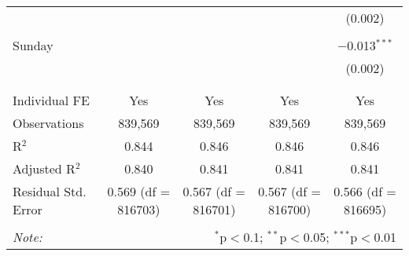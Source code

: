\documentclass[
]{article}
\begin{document}
\begin{table}[!htbp]
{\begin{tabular}{@{\extracolsep{5pt}}lcccc}
  &  &  &  & (0.002) \\ 
  & & & & \\ 
 Sunday &  &  &  & $-$0.013$^{***}$ \\ 
  &  &  &  & (0.002) \\ 
  & & & & \\ 
\hline \\[-1.8ex] 
Individual FE & Yes & Yes & Yes & Yes \\ 
Observations & 839,569 & 839,569 & 839,569 & 839,569 \\ 
R$^{2}$ & 0.844 & 0.846 & 0.846 & 0.846 \\ 
Adjusted R$^{2}$ & 0.840 & 0.841 & 0.841 & 0.841 \\ 
Residual Std. Error & 0.569 (df = 816703) & 0.567 (df = 816701) & 0.567 (df = 816700) & 0.566 (df = 816695) \\ 
\hline 
\hline \\[-1.8ex] 
\textit{Note:}  & \multicolumn{4}{r}{$^{*}$p$<$0.1; $^{**}$p$<$0.05; $^{***}$p$<$0.01} \\ 
\end{tabular}
} 
\end{table} 
\newpage
\end{document}
